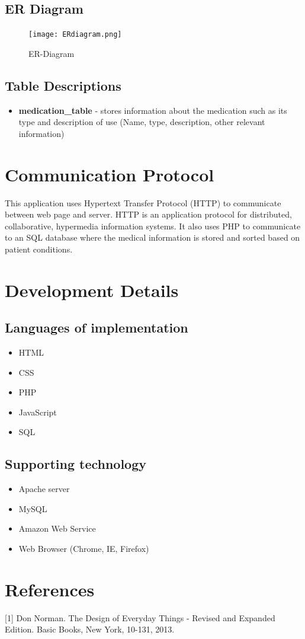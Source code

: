\documentclass[12pt]{article}
\begin{document}
\subsection{ER Diagram}
\begin{figure}[H]
  \centering
  \texttt{[image: ERdiagram.png]}
  \caption{ER-Diagram}
  \label{fig:er}
\end{figure}

\subsection{Table Descriptions}
\begin{itemize}
\item \textbf{medication\_table} - stores information about the medication such as its type and description of use (Name, type, description, other relevant information)
\end{itemize}

\section{Communication Protocol}
This application uses Hypertext Transfer Protocol (HTTP) to communicate between web page and server. HTTP is an application protocol for distributed, collaborative, hypermedia information systems. It also uses PHP to communicate to an SQL database where the medical information is stored and sorted based on patient conditions.


\section{Development Details}

\subsection{Languages of implementation}
\begin{itemize}
\item HTML
\item CSS
\item PHP
\item JavaScript
\item SQL
\end{itemize}

\subsection{Supporting technology}
\begin{itemize}
\item Apache server
\item MySQL
\item Amazon Web Service
\item Web Browser (Chrome, IE, Firefox)
\end{itemize}

\section{References}
[1] Don Norman. The Design of Everyday Things - Revised and Expanded Edition. Basic
Books, New York, 10-131, 2013.
\end{document}
